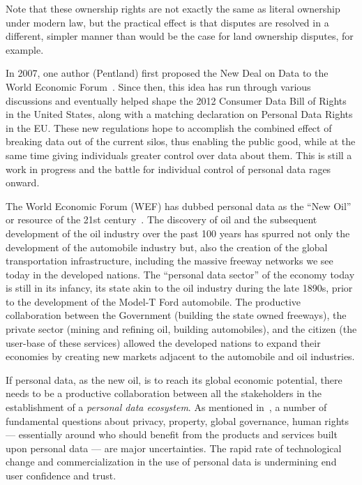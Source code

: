 Note that these ownership rights are not exactly the same as literal ownership under modern law, but the practical effect is that disputes are resolved in a different, simpler manner than would be the case for land ownership disputes, for example.

In 2007, one author (Pentland) first proposed the New Deal on Data to the World Economic Forum~\cite{WEF2011}. 
Since then, this idea has run through various discussions and eventually helped shape the 2012 Consumer Data Bill of Rights in the United States, along with a matching declaration on Personal Data Rights in the EU.
These new regulations hope to accomplish the combined effect of breaking data out of the current silos, thus enabling the public good, while at the same time giving individuals greater control over data about them. This is still a work in progress and the battle for individual control of personal data rages onward.


The World Economic Forum (WEF) has dubbed personal data as the ``New Oil'' or resource of the 21st century~\cite{WEF2011}.
The discovery of oil and the subsequent development of the oil industry over the past 100 years has spurred not only the development of the automobile industry but, also the creation of the global transportation infrastructure, including the massive freeway networks we see today in the developed nations.
The ``personal data sector'' of the economy today is still in its infancy, its state akin to the oil industry during the late 1890s, prior to the development of the Model-T Ford automobile.
The productive collaboration between the Government (building the state owned freeways), the private sector (mining and refining oil, building automobiles), and the citizen (the user-base of these services) allowed the developed nations to expand their economies by creating new markets adjacent to the automobile and oil industries.

If personal data, as the new oil, is to reach  its global economic potential, there needs to be a productive collaboration between all the stakeholders in the establishment of a {\em personal data ecosystem}.
As mentioned in~\cite{WEF2011}, a number of fundamental questions about privacy, property, 
global governance, human rights --- essentially around who should benefit from the products and services built upon personal data --- are major uncertainties.
The rapid rate of technological change and commercialization in the use of personal data is undermining end user confidence and trust.

